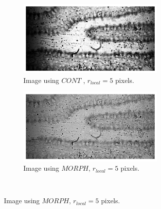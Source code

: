 \begin{figure}[h!]
    \begin{subfigure}[b]{0.5\textwidth}
        \centering
        \includegraphics[width=0.8\textwidth, frame]{afbeeldingen/rank/img_cont.png}
        \caption{Image using $CONT$ , $r_{local}=5$ pixels.}
        \label{fig_rank_cont}
    \end{subfigure}
    \begin{subfigure}[b]{0.5\textwidth}
        \centering
        \includegraphics[width=0.8\textwidth, frame]{afbeeldingen/rank/img_morph.png}
        \caption{Image using $MORPH$, $r_{local}=5$ pixels.}
        \label{fig_rank_morph}
    \end{subfigure}
\\


\end{figure}
